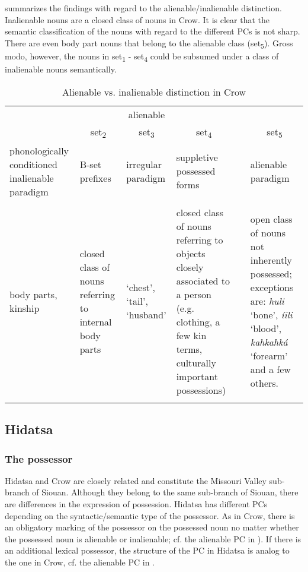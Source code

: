 \documentclass[output=paper]{LSP/langsci}
\begin{document}
 summarizes the findings with regard to the alienable/inalienable distinction. Inalienable nouns are a closed class of nouns in Crow. It is clear that the semantic classification of the nouns with regard to the different PCs is not sharp. There are even body part nouns that belong to the alienable class (set\textsubscript{5}). Gross modo, however, the nouns in set\textsubscript{1} - set\textsubscript{4} could be subsumed under a class of inalienable nouns semantically.

\begin{table}
\caption{Alienable vs. inalienable distinction in Crow} \label{crowalienability}  
\begin{tabularx}{\textwidth}{ Xp{2cm}XXcX }
\lsptoprule
\multicolumn{4}{c}{inalienable } && \multicolumn{1}{c}{alienable} \\
\hhline{----~-}
\multicolumn{1}{c}{set\textsubscript{1}} &
\multicolumn{1}{c}{ set\textsubscript{2}}	& 
\multicolumn{1}{c}{set\textsubscript{3}} & 
\multicolumn{1}{c}{set\textsubscript{4}} && 
\multicolumn{1}{c}{set\textsubscript{5}} \\
\midrule
phonologically conditioned inalienable paradigm & 	B-set  \mbox{prefixes} & irregular  paradigm & suppletive possessed forms && alienable paradigm \\ 
\\

body parts, kinship & 
 \raggedright closed class  of nouns  referring to  internal body  parts & 
`chest', `tail', `husband'	  & 
\raggedright closed class of nouns  referring to objects  closely associated to a person (e.g. clothing, a few kin terms, culturally  important possessions)  && 
open class of nouns not inherently possessed; exceptions are: \textit{huli}  `bone', \textit{íili} `blood',  \textit{kahkahká} `forearm' and a  few others. \\ 
\lspbottomrule
\end{tabularx}  
\end{table}
 
\subsection{Hidatsa}\label{sec:helmbrecht:4.2} \label{hidatsa} 
\subsubsection{The possessor}
Hidatsa and Crow are closely related and constitute the Missouri Valley sub-branch of Siouan. Although they belong to the same sub-branch of Siouan, there are differences in the expression of possession. Hidatsa has different PCs depending on the syntactic/semantic type of the possessor. As in Crow, there is an obligatory marking of the possessor on the possessed noun no matter whether the possessed noun is alienable or inalienable; cf. the alienable PC in ). If there is an additional lexical possessor, the structure of the PC in Hidatsa is analog to the one in Crow, cf. the alienable PC in .
\end{document}
